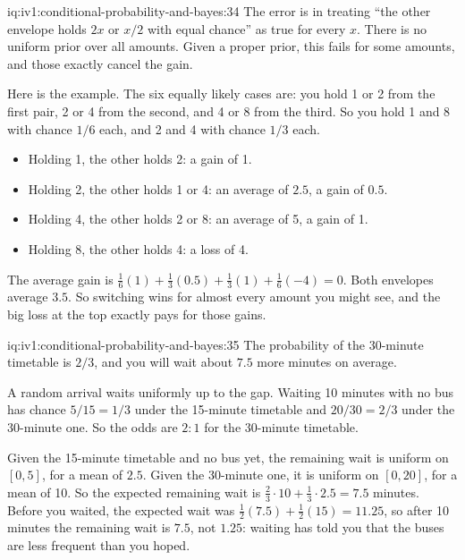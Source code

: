 \begin{solution}{iq:iv1:conditional-probability-and-bayes:34}
The error is in treating ``the other envelope holds $2x$ or $x/2$ with equal chance'' as true for every $x$. There is no uniform prior over all amounts. Given a proper prior, this fails for some amounts, and those exactly cancel the gain.

Here is the example. The six equally likely cases are: you hold 1 or 2 from the first pair, 2 or 4 from the second, and 4 or 8 from the third. So you hold 1 and 8 with chance $1/6$ each, and 2 and 4 with chance $1/3$ each.
\begin{itemize}
\item Holding 1, the other holds 2: a gain of 1.
\item Holding 2, the other holds 1 or 4: an average of $2.5$, a gain of $0.5$.
\item Holding 4, the other holds 2 or 8: an average of 5, a gain of 1.
\item Holding 8, the other holds 4: a loss of 4.
\end{itemize}
The average gain is $\tfrac16(1) + \tfrac13(0.5) + \tfrac13(1) + \tfrac16(-4) = 0$. Both envelopes average $3.5$. So switching wins for almost every amount you might see, and the big loss at the top exactly pays for those gains.

\end{solution}

\begin{solution}{iq:iv1:conditional-probability-and-bayes:35}
The probability of the 30-minute timetable is $2/3$, and you will wait about $7.5$ more minutes on average.

A random arrival waits uniformly up to the gap. Waiting 10 minutes with no bus has chance $5/15 = 1/3$ under the 15-minute timetable and $20/30 = 2/3$ under the 30-minute one. So the odds are $2 : 1$ for the 30-minute timetable.

Given the 15-minute timetable and no bus yet, the remaining wait is uniform on $[0, 5]$, for a mean of $2.5$. Given the 30-minute one, it is uniform on $[0, 20]$, for a mean of 10. So the expected remaining wait is $\tfrac23 \cdot 10 + \tfrac13 \cdot 2.5 = 7.5$ minutes. Before you waited, the expected wait was $\tfrac12(7.5) + \tfrac12(15) = 11.25$, so after 10 minutes the remaining wait is $7.5$, not $1.25$: waiting has told you that the buses are less frequent than you hoped.

\end{solution}


